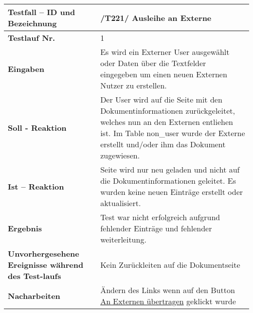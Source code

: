 \begin{longtable}{|p{5cm}|p{10cm}|}
\hline
\textbf{Testfall -- ID und Bezeichnung} & \textnormal{/T221/ Ausleihe an Externe} \\
\hline
\textbf{Testlauf Nr.} & \textnormal{1} \\
\hline
\textbf{Eingaben} & \textnormal{
Es wird ein Externer User ausgewählt oder Daten über die Textfelder eingegeben
um einen neuen Externen Nutzer zu erstellen.
} \\
\hline
\textbf{Soll - Reaktion} & \textnormal{
Der User wird auf die Seite mit den Dokumentinformationen zurückgeleitet,
welches nun an den Externen entliehen ist.
Im Table non\_user wurde der Externe erstellt und/oder ihm das Dokument
zugewiesen.
} \\
\hline
\textbf{Ist -- Reaktion} & \textnormal{
Seite wird nur neu geladen und nicht auf die Dokumentinformationen geleitet.
Es wurden keine neuen Einträge erstellt oder aktualisiert.
} \\
\hline
\textbf{Ergebnis} & \textnormal{
Test war nicht erfolgreich aufgrund fehlender Einträge und fehlender
weiterleitung.
} \\
\hline
\textbf{Unvorhergesehene Ereignisse w\"ahrend des Test-laufs } &
\textnormal{Kein Zurückleiten auf die Dokumentseite} \\
\hline
\textbf{Nacharbeiten } & \textnormal{Ändern des Links wenn auf den Button \uline{An
Externen übertragen} geklickt wurde} \\
\hline
 \end{longtable}

